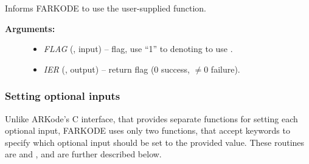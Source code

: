 \documentclass[letterpaper,10pt,english]{sphinxmanual}
\begin{document}
\begin{fulllineitems}
\label{f_interface/Usage:f/_/FARKEWTSET}
Informs FARKODE to use the user-supplied {\hyperref[f_interface/Usage:f/_/FARKEWT]{\emph{}}} function.
\begin{description}
\item[{\textbf{Arguments:}}] \leavevmode\begin{itemize}
\item {} 
\emph{FLAG} (, input) -- flag, use ``1'' to denoting to use {\hyperref[f_interface/Usage:f/_/FARKEWT]{\emph{}}}.

\item {} 
\emph{IER} (, output) -- return flag (0 success, \(\ne 0\) failure).

\end{itemize}

\end{description}

\end{fulllineitems}



\subsubsection{Setting optional inputs}
\label{f_interface/Usage:setting-optional-inputs}\label{f_interface/Usage:finterface-optionalinputs}
Unlike ARKode's C interface, that provides separate functions for
setting each optional input, FARKODE uses only two functions, that
accept keywords to specify which optional input should be set to the
provided value.  These routines are {\hyperref[f_interface/Usage:f/_/FARKSETIIN]{\emph{}}} and
{\hyperref[f_interface/Usage:f/_/FARKSETRIN]{\emph{}}}, and are further described below.
\end{document}
